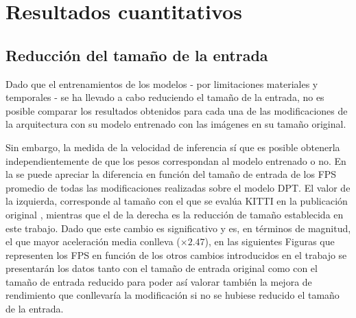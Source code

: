 \begin{figure}
\begin{minipage}{.45\textwidth}
  \label{fig:resultados-inf-tam-entrada}
\end{minipage}
\end{figure}

\section{Resultados cuantitativos}

\subsection{Reducción del tamaño de la entrada}



Dado que el entrenamientos de los modelos - por limitaciones materiales y temporales - se ha llevado a cabo reduciendo el tamaño de la entrada, no es posible comparar los resultados obtenidos para cada una de las modificaciones de la arquitectura con su modelo entrenado con las imágenes en su tamaño original.

Sin embargo, la medida de la velocidad de inferencia sí que es posible obtenerla independientemente de que los pesos correspondan al modelo entrenado o no. En la  se puede apreciar la diferencia en función del tamaño de entrada de los FPS promedio de todas las modificaciones realizadas sobre el modelo DPT. El valor de la izquierda, corresponde al tamaño con el que se evalúa KITTI en la publicación original \cite{visiontransformersDPT}, mientras que el de la derecha es la reducción de tamaño establecida en este trabajo. Dado que este cambio es significativo y es, en términos de magnitud, el que mayor aceleración media conlleva ($\times2.47$), en las siguientes Figuras que representen los FPS en función de los otros cambios introducidos en el trabajo se presentarán los datos tanto con el tamaño de entrada original como con el tamaño de entrada reducido para poder así valorar también la mejora de rendimiento que conllevaría la modificación si no se hubiese reducido el tamaño de la entrada.



















